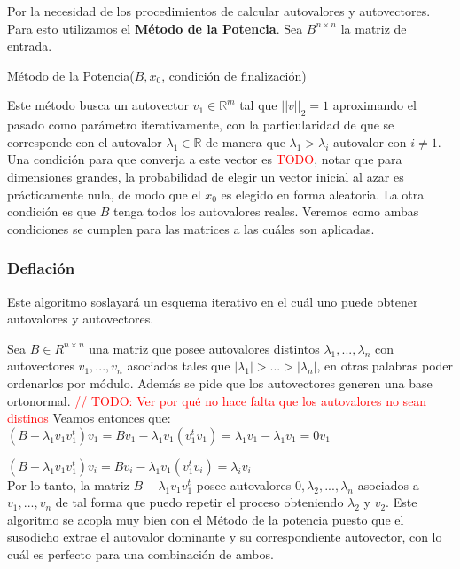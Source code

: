 Por la necesidad de los procedimientos de calcular autovalores y autovectores. Para esto utilizamos el \textbf{M\'etodo de la Potencia}. Sea $B^{n \times n}$ la matriz de entrada.

\begin{algorithm}
\begin{algorithmic}[1]
\ENDWHILE
{}
\end{algorithmic}
\caption{M\'etodo de la Potencia($B, x_{0}$, condici\'on de finalizaci\'on)}
\end{algorithm}

Este m\'etodo busca un autovector $v_{1} \in \mathbb{R}^{m}$ tal que $\vert\vert v \vert\vert_{2} = 1$ aproximando el pasado como par\'ametro iterativamente, con la particularidad de que se corresponde con el autovalor $\lambda_{1} \in \mathbb{R}$ de manera que $\lambda_{1} > \lambda_{i}$ autovalor con $i \neq 1$. Una condici\'on para que converja a este vector es \textcolor{red}{TODO}, notar que para dimensiones grandes, la probabilidad de elegir un vector inicial al azar es pr\'acticamente nula, de modo que el $x_{0}$ es elegido en forma aleatoria. La otra condici\'on es que $B$ tenga todos los autovalores reales. Veremos como ambas condiciones se cumplen para las matrices a las cu\'ales son aplicadas.

\subsubsection{Deflaci\'on}\label{desarrollo_deflacion}

Este algoritmo soslayar\'a un esquema iterativo en el cu\'al uno puede obtener autovalores y autovectores.

Sea $B \in R^{n \times n}$ una matriz que posee autovalores distintos $\lambda_{1}, ..., \lambda_{n}$ con autovectores $v_{1}, ..., v_{n}$ asociados tales que $\vert \lambda_{1} \vert > ... > \vert \lambda_{n} \vert$, en otras palabras poder ordenarlos por m\'odulo. Adem\'as se pide que los autovectores generen una base ortonormal. \textcolor{red}{// TODO: Ver por qu\'e no hace falta que los autovalores no sean distinos} Veamos entonces que: \\

$(B - \lambda_{1}v_{1}v_{1}^{t})v_{1} = Bv_{1} - \lambda_{1}v_{1}(v_{1}^{t}v_{1}) = \lambda_{1}v_{1} - \lambda_{1}v_{1} = 0v_{1}$

$(B - \lambda_{1}v_{1}v_{1}^{t})v_{i} = Bv_{i} - \lambda_{1}v_{1}(v_{1}^{t}v_{i}) = \lambda_{i}v_{i}$ \\

Por lo tanto, la matriz $B - \lambda_{1}v_{1}v_{1}^{t}$ posee autovalores $0, \lambda_{2}, ..., \lambda_{n}$ asociados a $v_{1}, ..., v_{n}$ de tal forma que puedo repetir el proceso obteniendo $\lambda_{2}$ y $v_{2}$. Este algoritmo se acopla muy bien con el M\'etodo de la potencia puesto que el susodicho extrae el autovalor dominante y su correspondiente autovector, con lo cu\'al es perfecto para una combinaci\'on de ambos.